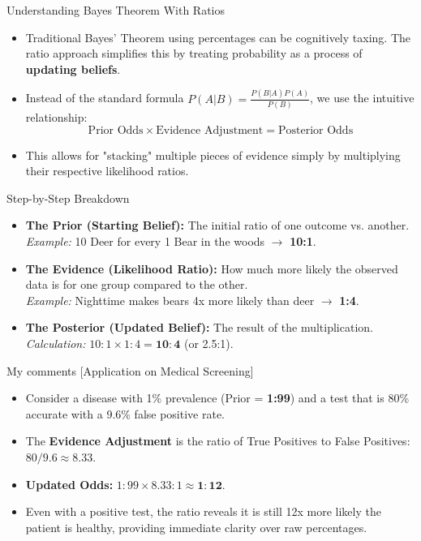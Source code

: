 \documentclass[12pt]{article}
\begin{document}
\begin{presentationbox}{Understanding Bayes Theorem With Ratios}
    \begin{itemize}[label=\color{blue}$\bullet$]
        \item Traditional Bayes' Theorem using percentages can be cognitively taxing. The ratio approach simplifies this by treating probability as a process of \textbf{updating beliefs}.
        \item Instead of the standard formula $P(A|B) = \frac{P(B|A)P(A)}{P(B)}$, we use the intuitive relationship:
              $$\text{Prior Odds} \times \text{Evidence Adjustment} = \text{Posterior Odds}$$
        \item This allows for "stacking" multiple pieces of evidence simply by multiplying their respective likelihood ratios.
    \end{itemize}
\end{presentationbox}

\begin{presentationbox}{Step-by-Step Breakdown}
    \begin{itemize} [label=\color{blue}$\bullet$]
        \item \textbf{The Prior (Starting Belief):} The initial ratio of one outcome vs. another.
              \\ \textit{Example:} 10 Deer for every 1 Bear in the woods $\rightarrow$ \textbf{10:1}.
        \item \textbf{The Evidence (Likelihood Ratio):} How much more likely the observed data is for one group compared to the other.
              \\ \textit{Example:} Nighttime makes bears 4x more likely than deer $\rightarrow$ \textbf{1:4}.
        \item \textbf{The Posterior (Updated Belief):} The result of the multiplication.
              \\ \textit{Calculation:} $10:1 \times 1:4 = \mathbf{10:4}$ (or 2.5:1).
    \end{itemize}
\end{presentationbox}

\begin{presentationbox}{My comments [Application on Medical Screening]}
    \begin{itemize} [label=\color{blue}$\bullet$]
        \item Consider a disease with 1\% prevalence (Prior = \textbf{1:99}) and a test that is 80\% accurate with a 9.6\% false positive rate.
        \item The \textbf{Evidence Adjustment} is the ratio of True Positives to False Positives: $80 / 9.6 \approx \mathbf{8.33}$.
        \item \textbf{Updated Odds:} $1:99 \times 8.33:1 \approx \mathbf{1:12}$.
        \item Even with a positive test, the ratio reveals it is still 12x more likely the patient is healthy, providing immediate clarity over raw percentages.
    \end{itemize}
\end{presentationbox}
\end{document}
